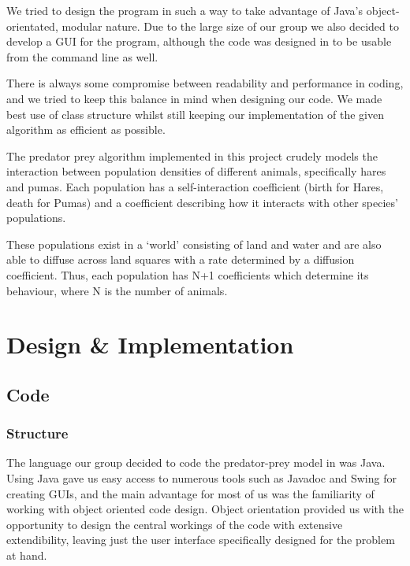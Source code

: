 \documentclass[11pt]{report}
\begin{document}

We tried to design the program in such a way to take advantage of Java's object-orientated, modular nature. 
Due to the large size of our group we also decided to develop a GUI for the program, although the code was designed 
in to be usable from the command line as well.\newline{}

There is always some compromise between readability and performance in coding, and we tried to keep this balance in mind
when designing our code. We made best use of class structure whilst still keeping our implementation of the given 
algorithm as efficient as possible.\newline{}

The predator prey algorithm implemented in this project crudely models the interaction between population densities of different animals, specifically hares and pumas. Each population has a self-interaction coefficient (birth for Hares, death for Pumas) and a coefficient describing how it interacts with other species' populations. \newline{}

These populations exist in a `world' consisting of land and water and are also able to diffuse across land squares with a rate determined by a diffusion coefficient. Thus, each population has N+1 coefficients which determine its behaviour, where N is the number of animals.

\chapter{Design \& Implementation}
   \section{Code}
      \subsection{Structure} %
          The language our group decided to code the predator-prey model in was Java. Using Java gave us easy access to numerous tools such as Javadoc and Swing for creating GUIs, and the main advantage for most of us was the familiarity of working with object oriented code design. Object orientation provided us with the opportunity to design the central workings of the code with extensive extendibility, leaving just the user interface specifically designed for the problem at hand.
\end{document}
